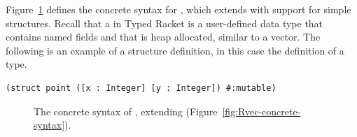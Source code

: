 \documentclass[11pt]{book}
\newcommand{\gray}[1]{{\color{gray} #1}}
\begin{document}
Figure~\ref{fig:r3s-concrete-syntax} defines the concrete syntax for
\LangStruct{}, which extends \LangVec{} with support for simple structures.
Recall that a  in Typed Racket is a user-defined data
type that contains named fields and that is heap allocated, similar to
a vector. The following is an example of a structure definition, in
this case the definition of a  type.
\begin{lstlisting}
(struct point ([x : Integer] [y : Integer]) #:mutable)
\end{lstlisting}

\begin{figure}[tbp]
\centering
\fbox{
\begin{minipage}{0.96\textwidth}
\[
\begin{array}{lcl}
  \Type &::=& \gray{\key{Integer} \mid \key{Boolean}
  \mid (\key{Vector}\;\Type \ldots) \mid \key{Void} } \mid \Var \\
  \itm{cmp} &::= & \gray{ \key{eq?} \mid \key{<} \mid \key{<=} \mid \key{>} \mid \key{>=} } \\
  \Exp &::=& \gray{  \Int \mid (\key{read}) \mid (\key{-}\;\Exp) \mid (\key{+} \; \Exp\;\Exp) \mid (\key{-}\;\Exp\;\Exp) }  \\
  &\mid&  \gray{  \Var \mid (\key{let}~([\Var~\Exp])~\Exp)  }\\
  &\mid& \gray{ \key{\#t} \mid \key{\#f} 
   \mid (\key{and}\;\Exp\;\Exp) 
   \mid (\key{or}\;\Exp\;\Exp)
   \mid (\key{not}\;\Exp) } \\
  &\mid& \gray{  (\itm{cmp}\;\Exp\;\Exp) 
   \mid (\key{if}~\Exp~\Exp~\Exp)  } \\
  &\mid& \gray{ (\key{vector}\;\Exp \ldots) 
   \mid (\key{vector-ref}\;\Exp\;\Int) } \\
  &\mid& \gray{ (\key{vector-set!}\;\Exp\;\Int\;\Exp) }\\
  &\mid& \gray{ (\key{void}) } \mid (\Var\;\Exp \ldots)\\
  \Def &::=& (\key{struct}\; \Var \; ([\Var \,\key{:}\, \Type] \ldots)\; \code{\#:mutable})\\
  \LangStruct{} &::=& \Def \ldots \; \Exp
\end{array}
\]
\end{minipage}
}
\caption{The concrete syntax of \LangStruct{}, extending \LangVec{}
  (Figure~\ref{fig:Rvec-concrete-syntax}).}
\label{fig:r3s-concrete-syntax}
\end{figure}
\end{document}
